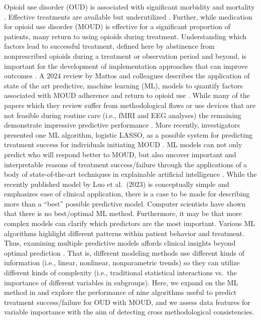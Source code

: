 \documentclass[
  number,
  preprint,
  3p,
  onecolumn]{elsarticle}
\begin{document}
Opioid use disorder (OUD) is associated with significant morbidity and
mortality \citep{hser2017, products2024, taylor2022}. Effective
treatments are available but underutilized \citep{cantor2024}. Further,
while medication for opioid use disorder (MOUD) is effective for a
significant proportion of patients, many return to using opioids during
treatment. Understanding which factors lead to successful treatment,
defined here by abstinence from nonprescribed opioids during a treatment
or observation period and beyond, is important for the development of
implementation approaches that can improve outcomes
\citep{hser1997, gustin2015, bell2020, leshner_medications_2019, wakeman2020}.
A 2024 review by Mattos and colleagues describes the application of
state of the art predictive, machine learning (ML), models to quantify
factors associated with MOUD adherence and return to opioid use
\citep{demattos2024a}. While many of the papers which they review suffer
from methodological flaws or use devices that are not feasible during
routine care (i.e., fMRI and EEG analyses) the remaining demonstrate
impressive predictive performance
\citep{burgess-hull2022, baucum2023, eddie2024}. More recently,
investigators presented one ML algorithm, logistic LASSO, as a possible
system for predicting treatment success for individuals initiating MOUD
\citep{Luo2023}. ML models can not only predict who will respond better
to MOUD, but also uncover important and interpretable reasons of
treatment success/failure through the applications of a body of
state-of-the-art techniques in explainable artificial intelligence
\citep{molnar2022a, biecek2021a}. While the recently published model by
Luo et al.~(2023) is conceptually simple and emphasizes ease of clinical
application, there is a case to be made for describing more than a
``best'' possible predictive model. Computer scientists have shown that
there is no best/optimal ML method. Furthermore, it may be that more
complex models can clarify which predictors are the most important.
Various ML algorithms highlight different patterns within patient
behavior and treatment. Thus, examining multiple predictive models
affords clinical insights beyond optimal prediction
\citep{nofree2024, biecek2021a}. That is, different modeling methods use
different kinds of information (i.e., linear, nonlinear, nonparametric
trends) so they can utilize different kinds of complexity (i.e.,
traditional statistical interactions vs.~the importance of different
variables in subgroups). Here, we expand on the ML method in
\citep{Luo2023} and explore the performance of nine algorithms useful to
predict treatment success/failure for OUD with MOUD, and we assess data
features for variable importance with the aim of detecting cross
methodological consistencies.
\end{document}
